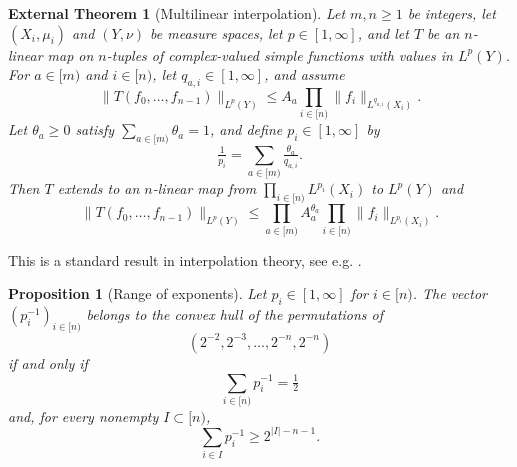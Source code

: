 \documentclass[12pt,reqno]{amsart}
\theoremstyle{plain}
\newtheorem{exttheorem}[theorem]{External Theorem}
\newtheorem{proposition}[theorem]{Proposition}
\numberwithin{equation}{section}
\theoremstyle{remark}
\newcommand{\uses}[1]{}
\newcommand{\usesdefs}[1]{}
\newcommand{\leanok}{}
\newcommand{\lean}[1]{}
\begin{document}
\begin{exttheorem}[Multilinear interpolation]\label{multilinear interpolation external}\lean{Auto.multilinear_interpolation_external}\leanok\uses{}\usesdefs{}
Let $m,n\ge 1$ be integers, let $(X_i,\mu_i)$ and $(Y,\nu)$ be measure spaces, let $p\in[1,\infty]$, and let $T$ be an $n$-linear map on $n$-tuples of complex-valued simple functions with values in $L^p(Y)$. For $a\in[m)$ and $i\in[n)$, let $q_{a,i}\in[1,\infty]$, and assume
\begin{equation}\label{multilinear interpolation endpoint}
\|T(f_0,\ldots,f_{n-1})\|_{L^p(Y)}\le A_a\prod_{i\in[n)}\|f_i\|_{L^{q_{a,i}}(X_i)}.
\end{equation}
Let $\theta_a\ge 0$ satisfy $\sum_{a\in[m)}\theta_a=1$, and define $p_i\in[1,\infty]$ by
\begin{equation}\label{multilinear interpolation exponents}
\tfrac1{p_i}=\sum_{a\in[m)}\tfrac{\theta_a}{q_{a,i}}.
\end{equation}
Then $T$ extends to an $n$-linear map from $\prod_{i\in[n)}L^{p_i}(X_i)$ to $L^p(Y)$ and
\begin{equation}\label{multilinear interpolation conclusion}
\|T(f_0,\ldots,f_{n-1})\|_{L^p(Y)}\le \prod_{a\in[m)}A_a^{\theta_a}\prod_{i\in[n)}\|f_i\|_{L^{p_i}(X_i)}.
\end{equation}
\end{exttheorem}

This is a standard result in interpolation theory, see e.g. \cite{BerghLofstrom}.

\begin{proposition}[Range of exponents]\label{exponent polytope}\lean{Auto.exponent_polytope,Auto.exponent_polytope_of_exponents}\leanok\uses{}\usesdefs{}
Let $p_i\in[1,\infty]$ for $i\in[n)$. The vector $(p_i^{-1})_{i\in[n)}$ belongs to the convex hull of the permutations of
\begin{equation}\label{endpoint reciprocal vector}
(2^{-2},2^{-3},\ldots,2^{-n},2^{-n})
\end{equation}
if and only if
\begin{equation}\label{exponent polytope sum}
\sum_{i\in[n)}p_i^{-1}=\tfrac12
\end{equation}
and, for every nonempty $I\subset[n)$,
\begin{equation}\label{exponent polytope inequalities}
\sum_{i\in I}p_i^{-1}\ge 2^{|I|-n-1}.
\end{equation}
\end{proposition}
\end{document}
